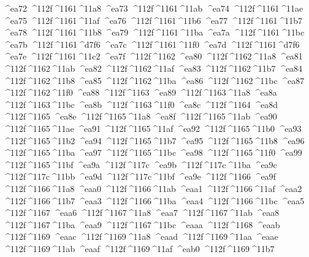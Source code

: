 \checkit ^^^^ea72 ^^^^112f^^^^1161^^^^11a8
\checkit ^^^^ea73 ^^^^112f^^^^1161^^^^11ab
\checkit ^^^^ea74 ^^^^112f^^^^1161^^^^11ae
\checkit ^^^^ea75 ^^^^112f^^^^1161^^^^11af
\checkit ^^^^ea76 ^^^^112f^^^^1161^^^^11b6
\checkit ^^^^ea77 ^^^^112f^^^^1161^^^^11b7
\checkit ^^^^ea78 ^^^^112f^^^^1161^^^^11b8
\checkit ^^^^ea79 ^^^^112f^^^^1161^^^^11ba
\checkit ^^^^ea7a ^^^^112f^^^^1161^^^^11bc
\checkit ^^^^ea7b ^^^^112f^^^^1161^^^^d7f6
\checkit ^^^^ea7c ^^^^112f^^^^1161^^^^11f0
\checkit ^^^^ea7d ^^^^112f^^^^1161^^^^d7f6
\checkit ^^^^ea7e ^^^^112f^^^^1161^^^^11c2
\checkit ^^^^ea7f ^^^^112f^^^^1162
\checkit ^^^^ea80 ^^^^112f^^^^1162^^^^11a8
\checkit ^^^^ea81 ^^^^112f^^^^1162^^^^11ab
\checkit ^^^^ea82 ^^^^112f^^^^1162^^^^11af
\checkit ^^^^ea83 ^^^^112f^^^^1162^^^^11b7
\checkit ^^^^ea84 ^^^^112f^^^^1162^^^^11b8
\checkit ^^^^ea85 ^^^^112f^^^^1162^^^^11ba
\checkit ^^^^ea86 ^^^^112f^^^^1162^^^^11bc
\checkit ^^^^ea87 ^^^^112f^^^^1162^^^^11f0
\checkit ^^^^ea88 ^^^^112f^^^^1163
\checkit ^^^^ea89 ^^^^112f^^^^1163^^^^11a8
\checkit ^^^^ea8a ^^^^112f^^^^1163^^^^11bc
\checkit ^^^^ea8b ^^^^112f^^^^1163^^^^11f0
\checkit ^^^^ea8c ^^^^112f^^^^1164
\checkit ^^^^ea8d ^^^^112f^^^^1165
\checkit ^^^^ea8e ^^^^112f^^^^1165^^^^11a8
\checkit ^^^^ea8f ^^^^112f^^^^1165^^^^11ab
\checkit ^^^^ea90 ^^^^112f^^^^1165^^^^11ae
\checkit ^^^^ea91 ^^^^112f^^^^1165^^^^11af
\checkit ^^^^ea92 ^^^^112f^^^^1165^^^^11b0
\checkit ^^^^ea93 ^^^^112f^^^^1165^^^^11b2
\checkit ^^^^ea94 ^^^^112f^^^^1165^^^^11b7
\checkit ^^^^ea95 ^^^^112f^^^^1165^^^^11b8
\checkit ^^^^ea96 ^^^^112f^^^^1165^^^^11ba
\checkit ^^^^ea97 ^^^^112f^^^^1165^^^^11bc
\checkit ^^^^ea98 ^^^^112f^^^^1165^^^^11f0
\checkit ^^^^ea99 ^^^^112f^^^^1165^^^^11bf
\checkit ^^^^ea9a ^^^^112f^^^^117c
\checkit ^^^^ea9b ^^^^112f^^^^117c^^^^11ba
\checkit ^^^^ea9c ^^^^112f^^^^117c^^^^11bb
\checkit ^^^^ea9d ^^^^112f^^^^117c^^^^11bf
\checkit ^^^^ea9e ^^^^112f^^^^1166
\checkit ^^^^ea9f ^^^^112f^^^^1166^^^^11a8
\checkit ^^^^eaa0 ^^^^112f^^^^1166^^^^11ab
\checkit ^^^^eaa1 ^^^^112f^^^^1166^^^^11af
\checkit ^^^^eaa2 ^^^^112f^^^^1166^^^^11b7
\checkit ^^^^eaa3 ^^^^112f^^^^1166^^^^11ba
\checkit ^^^^eaa4 ^^^^112f^^^^1166^^^^11bc
\checkit ^^^^eaa5 ^^^^112f^^^^1167
\checkit ^^^^eaa6 ^^^^112f^^^^1167^^^^11a8
\checkit ^^^^eaa7 ^^^^112f^^^^1167^^^^11ab
\checkit ^^^^eaa8 ^^^^112f^^^^1167^^^^11ba
\checkit ^^^^eaa9 ^^^^112f^^^^1167^^^^11bc
\checkit ^^^^eaaa ^^^^112f^^^^1168
\checkit ^^^^eaab ^^^^112f^^^^1169
\checkit ^^^^eaac ^^^^112f^^^^1169^^^^11a8
\checkit ^^^^eaad ^^^^112f^^^^1169^^^^11aa
\checkit ^^^^eaae ^^^^112f^^^^1169^^^^11ab
\checkit ^^^^eaaf ^^^^112f^^^^1169^^^^11af
\checkit ^^^^eab0 ^^^^112f^^^^1169^^^^11b7
